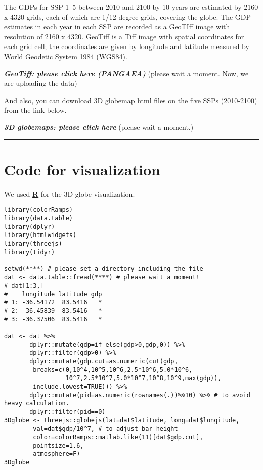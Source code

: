 \documentclass[]{book}
\begin{document}
The GDPs for SSP 1--5 between 2010 and 2100 by 10 years are estimated by 2160 x 4320 grids, each of which are 1/12-degree grids, covering the globe. The GDP estimates in each year in each SSP are recorded as a GeoTIff image with resolution of 2160 x 4320. GeoTiff is a Tiff image with spatial coordinates for each grid cell; the coordinates are given by longitude and latitude measured by World Geodetic System 1984 (WGS84).

\textbf{\emph{GeoTiff: please click here (PANGAEA)}} (please wait a moment. Now, we are uploading the data)

And also, you can download 3D globemap html files on the five SSPs (2010-2100) from the link below.

\textbf{\emph{3D globemaps: please click here}} (please wait a moment.)

\begin{center}\rule{0.5\linewidth}{\linethickness}\end{center}

\hypertarget{code-for-visualization}{%
\section*{Code for visualization}\label{code-for-visualization}}

We used \href{https://www.r-project.org/}{\textbf{R}} for the 3D globe visualization.

\begin{verbatim}
library(colorRamps)
library(data.table)
library(dplyr)
library(htmlwidgets)
library(threejs)
library(tidyr)

setwd(****) # please set a directory including the file
dat <- data.table::fread(****) # please wait a moment!
# dat[1:3,]
#    longitude latitude gdp
# 1: -36.54172  83.5416   *
# 2: -36.45839  83.5416   *
# 3: -36.37506  83.5416   *

dat <- dat %>%
       dplyr::mutate(gdp=if_else(gdp>0,gdp,0)) %>%
       dplyr::filter(gdp>0) %>%
       dplyr::mutate(gdp.cut=as.numeric(cut(gdp,
        breaks=c(0,10^4,10^5,10^6,2.5*10^6,5.0*10^6,
                 10^7,2.5*10^7,5.0*10^7,10^8,10^9,max(gdp)), 
        include.lowest=TRUE))) %>%
       dplyr::mutate(pid=as.numeric(rownames(.))%%10) %>% # to avoid heavy calculation.
       dplyr::filter(pid==0)
3Dglobe <- threejs::globejs(lat=dat$latitude, long=dat$longitude,
        val=dat$gdp/10^7, # to adjust bar height 
        color=colorRamps::matlab.like(11)[dat$gdp.cut],
        pointsize=1.6,
        atmosphere=F)
3Dglobe        
\end{verbatim}
\end{document}
